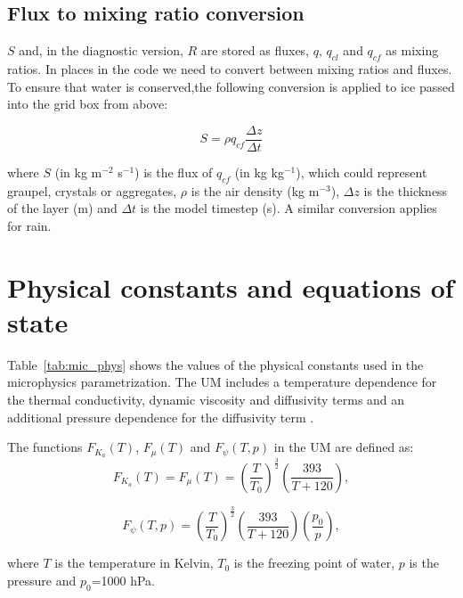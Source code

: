 \documentclass{UMDP_article}
\def\bq{\begin{equation}}
\def\eq{\end{equation}}
\begin{document}
\subsection{Flux to mixing ratio conversion}
\label{sec:flux_to_m}
$S$ and, in the diagnostic version, $R$ are stored as fluxes,
$q$, $q_{cl}$ and $q_{cf}$ as mixing ratios. In places 
in the code we need to convert between mixing ratios and fluxes. 
To ensure that water is conserved,the following conversion is applied to
ice passed into the grid box from above:

\bq
S = \rho  q_{cf} \frac{\Delta z}{\Delta t}
\eq

where $S$ (in kg m$^{-2}$ s$^{-1}$) is the flux of $q_{cf}$ (in kg kg$^{-1}$), 
which could represent graupel, crystals or aggregates, $\rho$  is
the air density (kg m$^{-3}$), $\Delta z$ is the thickness of the layer (m) and
$\Delta t$ is the model timestep (s). A similar conversion applies for rain.

\newpage

\section{Physical constants and equations of state}


Table~\ref{tab:mic_phys} shows the values of the physical constants used in
the microphysics parametrization. The UM includes a temperature dependence 
for the thermal conductivity, dynamic viscosity and diffusivity terms and 
an additional pressure dependence for the diffusivity term 
\citep{Rogers:Yau:1989}. 

 The functions $F_{K_a}(T)$, $F_{\mu}(T)$ and $F_{\psi}(T,p)$ in the UM are 
defined as:
\bq
  F_{K_a}(T) = F_{\mu}(T) = {\left( \frac{T}{T_0} \right)}^{\frac{3}{2}} 
\left( \frac{393}{T+120} \right),
\label{eq:mic_conductivity}
\eq

\bq
  F_{\psi}(T,p) = \left( \frac{T}{T_0} \right)^{\frac{3}{2}} 
 \left( \frac{393}{T+120} \right) \left( \frac{p_0}{p} \right),
\label{eq:mic_diffusivity}
\eq

where $T$ is the temperature in Kelvin, $T_0$ is the freezing point of water, 
$p$ is the pressure and $p_0$=1000 hPa. 
\end{document}
